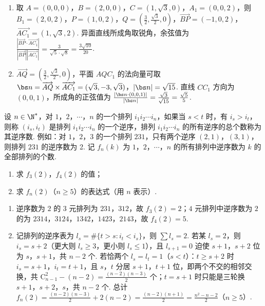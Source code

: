 \begin{solution}
\begin{enumerate}
\item 取 \(A=(0,0,0)\)，\(B=(2,0,0)\)，\(C=(1,\sqrt3,0)\)，\(A_1=(0,0,2)\)，则 \(B_1=(2,0,2)\)，\(P=(1,0,2)\)，\(Q=\left(\frac32,\frac{\sqrt3}{2},0\right)\)，\(\overrightarrow{BP}=(-1,0,2)\)，\(\overrightarrow{AC_1}=(1,\sqrt3,2)\). 异面直线所成角取锐角，余弦值为 \(\frac{|\overrightarrow{BP}\cdot\overrightarrow{AC_1}|}{|\overrightarrow{BP}||\overrightarrow{AC_1}|}=\frac{3}{\sqrt5\cdot\sqrt8}=\frac{3\sqrt{10}}{20}\).
\item \(\overrightarrow{AQ}=\left(\frac32,\frac{\sqrt3}{2},0\right)\)，平面 \(AQC_1\) 的法向量可取 \(\bs n=\overrightarrow{AQ}\times\overrightarrow{AC_1}=(\sqrt3,-3,\sqrt3)\)，\(|\bs n|=\sqrt{15}\). 直线 \(CC_1\) 方向为 \((0,0,1)\)，所成角的正弦值为 \(\frac{|\bs n\cdot(0,0,1)|}{|\bs n|}=\frac{\sqrt3}{\sqrt{15}}=\frac{\sqrt5}{5}\).
\end{enumerate}
\end{solution}

\begin{problem}
设 \(n\in\N^*\)，对 \(1\)，\(2\)，\(\cdots\)，\(n\) 的一个排列 \(i_1i_2\cdots i_n\)，如果当 \(s<t\) 时，有 \(i_s>i_t\)，则称 \((i_s,i_t)\) 是排列 \(i_1i_2\cdots i_n\) 的一个逆序，排列 \(i_1i_2\cdots i_n\) 的所有逆序的总个数称为其逆序数. 例如：对 \(1\)，\(2\)，\(3\) 的一个排列 \(231\)，只有两个逆序 \((2,1)\)，\((3,1)\)，则排列 \(231\) 的逆序数为 2. 记 \(f_n(k)\) 为 \(1\)，\(2\)，\(\cdots\)，\(n\) 的所有排列中逆序数为 \(k\) 的全部排列的个数.

\begin{enumerate}
\item 求 \(f_3(2)\)，\(f_4(2)\) 的值；
\item 求 \(f_n(2)\)（\(n\ge5\)）的表达式（用 \(n\) 表示）.
\end{enumerate}
\end{problem}

\begin{solution}
\begin{enumerate}
\item 逆序数为 \(2\) 的 \(3\) 元排列为 \(231\)，\(312\)，故 \(f_3(2)=2\)；\(4\) 元排列中逆序数为 \(2\) 的为 \(2314\)，\(3124\)，\(1342\)，\(1423\)，\(2143\)，故 \(f_4(2)=5\).
\item 记排列的逆序表为 \(l_s=\#\{t>s:i_t<i_s\}\)，则 \(\sum l_s=2\). 若某 \(l_s=2\)，则 \(i_s=s+2\)（更大则 \(l_s\geqslant3\)，更小则 \(l_s\leqslant1\)），且 \(l_{s+1}=0\) 迫使 \(s+1\)，\(s+2\) 位为 \(s\)，\(s+1\)，共 \(n-2\) 个. 若恰两个 \(l_s=l_t=1\)（\(s<t\)）：\(t\geqslant s+2\) 时 \(i_s=s+1\)，\(i_t=t+1\)，且 \(s\)，\(t\) 分居 \(s+1\)，\(t+1\) 位，即两个不交的相邻交换，共 \(\mathrm C_{n-1}^2-(n-2)=\frac{(n-2)(n-3)}{2}\) 个；\(t=s+1\) 时只能是三轮换 \(s+1\)，\(s+2\)，\(s\)，共 \(n-2\) 个. 总计 \(f_n(2)=\frac{(n-2)(n-3)}{2}+2(n-2)=\frac{(n-2)(n+1)}{2}=\frac{n^2-n-2}{2}\)（\(n\geqslant5\)）.
\end{enumerate}
\end{solution}
